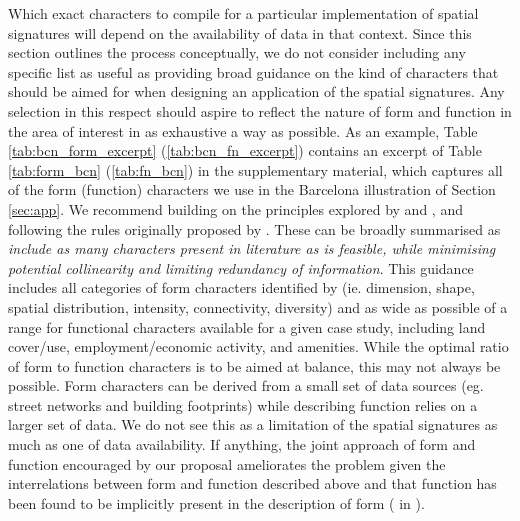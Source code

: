  
Which exact characters to compile for a particular implementation of spatial signatures
will depend on the availability of data in that context.
Since this section outlines the process conceptually, we do not consider including any specific
list as useful as providing broad guidance on the kind of characters that should 
be aimed for when designing an application of the spatial signatures.
Any selection in this respect should aspire to reflect the nature of form and function in the
area of interest in as exhaustive a way as possible.
As an example,
Table \ref{tab:bcn_form_excerpt} (\ref{tab:bcn_fn_excerpt}) contains an excerpt of Table
\ref{tab:form_bcn} (\ref{tab:fn_bcn}) in the supplementary
material, which captures all of the form (function) characters we use in the Barcelona illustration of
Section \ref{sec:app}.
%
We recommend building on the principles explored by \cite{dibble2019origin} and
\cite{fleischmann2021methodological}, and following the rules originally proposed by
\cite{sneath1973numerical}. These can be broadly summarised as
\emph{include as many characters present in literature as is feasible, while minimising
potential collinearity and limiting redundancy of information}. This guidance includes all
categories of form characters identified by \cite{fleischmann2020measuring} (ie. dimension,
shape, spatial distribution, intensity, connectivity, diversity) and as wide as possible of a range
for functional characters available for a given case study, including land cover/use,
employment/economic activity, and amenities. 
%
While the optimal ratio of form to function characters is to be aimed at balance, this may not
always be possible. Form characters can be derived from a small set of data sources (eg.
street networks and building footprints) while describing function relies on a larger set
of data. We do not see this as a limitation of the spatial signatures as much as one
of data availability. If anything, the joint approach of form and function encouraged
by our proposal ameliorates the problem given the interrelations between form and function
described above and that function has been found to be implicitly present in the description of form
(\citealp{caniggia2001architectural} in \citealp{kropf2009aspects}).

